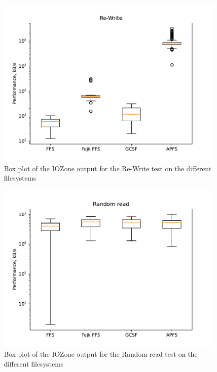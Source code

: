 \begin{figure}[!htb]
	\label{fig:res_box_rewrite}
	\begin{center}
		\includegraphics[width=1.0\textwidth]{figures/benchmarking/Re-Write_box.pdf}
	\end{center}
	\caption{Box plot of the IOZone output for the Re-Write test on the different filesystems}
\end{figure}

\begin{figure}[!htb]
	\label{fig:res_box_rndread}
	\begin{center}
		\includegraphics[width=1.0\textwidth]{figures/benchmarking/Random read_box.pdf}
	\end{center}
	\caption{Box plot of the IOZone output for the Random read test on the different filesystems}
\end{figure}


